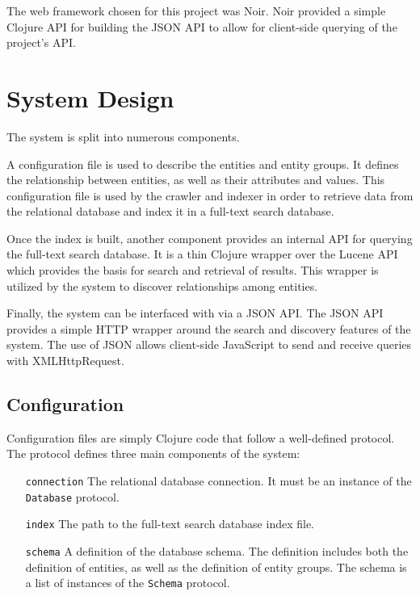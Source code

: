 \documentclass[12pt,letterpaper,oneside,notitlepage]{report}
\theoremstyle{definition}
\begin{document}
				The web framework chosen for this project was Noir.  Noir provided a simple Clojure API for building the JSON API to allow for client-side querying of the project's API.
			
		\section{System Design}
			The system is split into numerous components.
			
			A configuration file is used to describe the entities and entity groups.  It defines the relationship between entities, as well as their attributes and values.  This configuration file is used by the crawler and indexer in order to retrieve data from the relational database and index it in a full-text search database.
			
			Once the index is built, another component provides an internal API for querying the full-text search database.  It is a thin Clojure wrapper over the Lucene API which provides the basis for search and retrieval of results.  This wrapper is utilized by the system to discover relationships among entities.
			
			Finally, the system can be interfaced with via a JSON API.  The JSON API provides a simple HTTP wrapper around the search and discovery features of the system.  The use of JSON allows client-side JavaScript to send and receive queries with XMLHttpRequest.
			
			
			\subsection{Configuration}
				Configuration files are simply Clojure code that follow a well-defined protocol.  The protocol defines three main components of the system:
				
				\begin{itemize}
					\item[\texttt{connection}] The relational database connection.  It must be an instance of the \texttt{Database} protocol.
					\item[\texttt{index}] The path to the full-text search database index file.
					\item[\texttt{schema}] A definition of the database schema.  The definition includes both the definition of entities, as well as the definition of entity groups.  The schema is a list of instances of the \texttt{Schema} protocol.
				\end{itemize}
				
\end{document}

